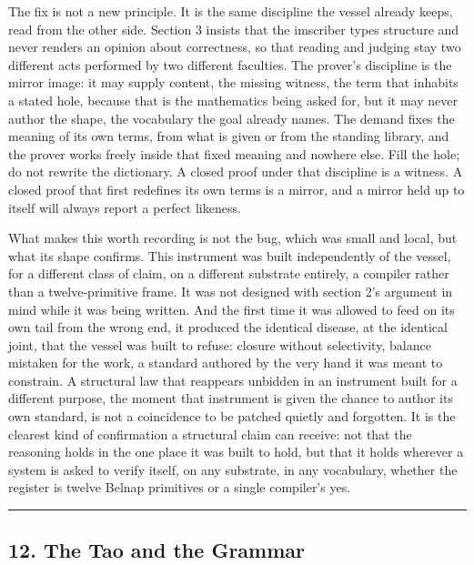 \documentclass[12pt,a4paper]{article}
\begin{document}
The fix is not a new principle. It is the same discipline the vessel
already keeps, read from the other side. Section 3 insists that the
imscriber types structure and never renders an opinion about
correctness, so that reading and judging stay two different acts
performed by two different faculties. The prover's discipline is the
mirror image: it may supply content, the missing witness, the term that
inhabits a stated hole, because that is the mathematics being asked for,
but it may never author the shape, the vocabulary the goal already
names. The demand fixes the meaning of its own terms, from what is given
or from the standing library, and the prover works freely inside that
fixed meaning and nowhere else. Fill the hole; do not rewrite the
dictionary. A closed proof under that discipline is a witness. A closed
proof that first redefines its own terms is a mirror, and a mirror held
up to itself will always report a perfect likeness.

What makes this worth recording is not the bug, which was small and
local, but what its shape confirms. This instrument was built
independently of the vessel, for a different class of claim, on a
different substrate entirely, a compiler rather than a twelve-primitive
frame. It was not designed with section 2's argument in mind while it
was being written. And the first time it was allowed to feed on its own
tail from the wrong end, it produced the identical disease, at the
identical joint, that the vessel was built to refuse: closure without
selectivity, balance mistaken for the work, a standard authored by the
very hand it was meant to constrain. A structural law that reappears
unbidden in an instrument built for a different purpose, the moment that
instrument is given the chance to author its own standard, is not a
coincidence to be patched quietly and forgotten. It is the clearest kind
of confirmation a structural claim can receive: not that the reasoning
holds in the one place it was built to hold, but that it holds wherever
a system is asked to verify itself, on any substrate, in any vocabulary,
whether the register is twelve Belnap primitives or a single compiler's
yes.

\begin{center}\rule{0.5\linewidth}{0.5pt}\end{center}

\hypertarget{the-tao-and-the-grammar}{%
\subsection{12. The Tao and the Grammar}\label{the-tao-and-the-grammar}}
\end{document}
